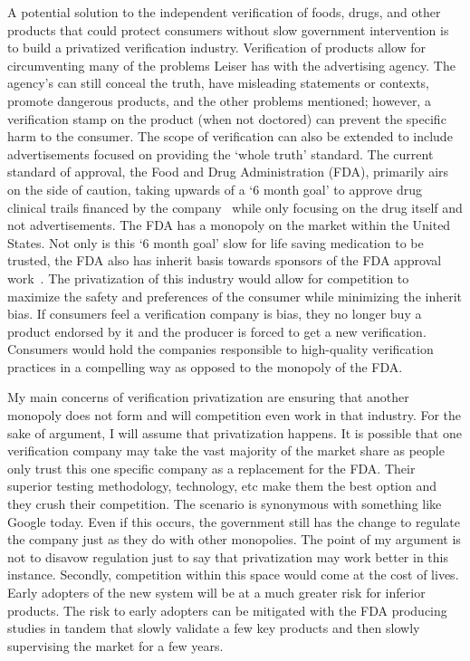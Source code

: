 \documentclass[12pt]{article}
\begin{document}
A potential solution to the independent verification of foods, drugs, and other
products that could protect consumers without slow government intervention is to
build a privatized verification industry. Verification of products allow for
circumventing many of the problems Leiser has with the advertising agency. The
agency's can still conceal the truth, have misleading statements or contexts,
promote dangerous products, and the other problems mentioned; however, a
verification stamp on the product (when not doctored) can prevent the specific
harm to the consumer. The scope of verification can also be extended to include
advertisements focused on providing the `whole truth' standard. The current
standard of approval, the Food and Drug Administration (FDA), primarily airs on
the side of caution, taking upwards of a `6 month goal' to approve drug clinical
trails financed by the company~\cite{fda} while only focusing on the drug
itself and not advertisements. The FDA has a monopoly on the market within the
United States. Not only is this `6 month goal' slow for life saving medication
to be trusted, the FDA also has inherit basis towards sponsors of the FDA
approval work~\cite{bias}. The privatization of this industry would allow for
competition to maximize the safety and preferences of the consumer while
minimizing the inherit bias. If consumers feel a verification company is bias,
they no longer buy a product endorsed by it and the producer is forced to get a
new verification. Consumers would hold the companies responsible to high-quality
verification practices in a compelling way as opposed to the monopoly of the
FDA.

My main concerns of verification privatization are ensuring that another
monopoly does not form and will competition even work in that industry. For the
sake of argument, I will assume that privatization happens. It is possible that
one verification company may take the vast majority of the market share as
people only trust this one specific company as a replacement for the FDA. Their
superior testing methodology, technology, etc make them the best option and they
crush their competition. The scenario is synonymous with something like Google
today. Even if this occurs, the government still has the change to regulate the
company just as they do with other monopolies. The point of my argument is not
to disavow regulation just to say that privatization may work better in this
instance. Secondly, competition within this space would come at the cost of
lives. Early adopters of the new system will be at a much greater risk for
inferior products. The risk to early adopters can be mitigated with the FDA
producing studies in tandem that slowly validate a few key products and then
slowly supervising the market for a few years.



\end{document}
